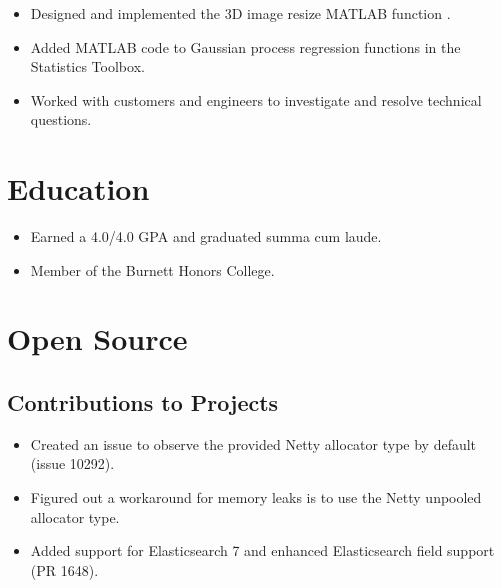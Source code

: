 \documentclass[letterpaper]{resume}
\begin{document}
\begin{minipage}[t]{0.74\columnwidth}
\sectionspace

\vspace{2pt}
\begin{itemize}
\item Designed and implemented the 3D image resize MATLAB function .
\item Added MATLAB code to Gaussian process regression functions in the Statistics Toolbox.
\item Worked with customers and engineers to investigate and resolve technical questions.
\end{itemize}

\sectionspace


\section{Education}

\vspace{2pt}
\begin{itemize}
\item Earned a 4.0/4.0 GPA and graduated summa cum laude.
\item Member of the Burnett Honors College.
\end{itemize}

\sectionspace


\section{Open Source}

\subsection{Contributions to Projects}
\vspace{2pt}
\begin{itemize}
\item Created an issue to observe the provided Netty allocator type by default (issue 10292).
\item Figured out a workaround for memory leaks is to use the Netty unpooled allocator type.
\end{itemize}
\vspace{3pt}
\vspace{2pt}
\begin{itemize}
\item Added support for Elasticsearch 7 and enhanced Elasticsearch field support (PR 1648).
\end{itemize}


\end{minipage}
\end{document}
